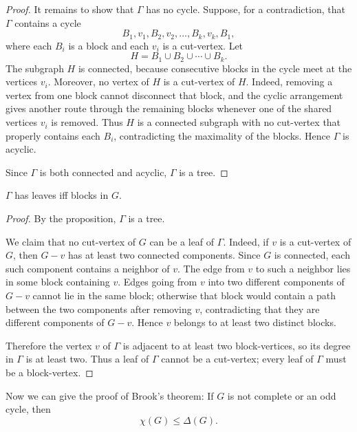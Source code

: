 \begin{proof}
    It remains to show that \(\Gamma\) has no cycle.  Suppose, for a contradiction, that \(\Gamma\) contains a cycle
    \[
        B_1, v_1, B_2, v_2, \ldots, B_k, v_k, B_1,
    \]
    where each \(B_i\) is a block and each \(v_i\) is a cut-vertex.  Let
    \[
        H = B_1 \cup B_2 \cup \cdots \cup B_k.
    \]
    The subgraph \(H\) is connected, because consecutive blocks in the cycle meet at the vertices \(v_i\).  Moreover, no vertex of \(H\) is a cut-vertex of \(H\).  Indeed, removing a vertex from one block cannot disconnect that block, and the cyclic arrangement gives another route through the remaining blocks whenever one of the shared vertices \(v_i\) is removed.  Thus \(H\) is a connected subgraph with no cut-vertex that properly contains each \(B_i\), contradicting the maximality of the blocks.  Hence \(\Gamma\) is acyclic.

    Since \(\Gamma\) is both connected and acyclic, \(\Gamma\) is a tree.
\end{proof}

\begin{corollary}
    \(\Gamma \) has leaves iff blocks in \(G\).  
\end{corollary}

\begin{proof}
    By the proposition, \(\Gamma\) is a tree.

    We claim that no cut-vertex of \(G\) can be a leaf of \(\Gamma\).  Indeed, if \(v\) is a cut-vertex of \(G\), then \(G-v\) has at least two connected components.  Since \(G\) is connected, each such component contains a neighbor of \(v\).  The edge from \(v\) to such a neighbor lies in some block containing \(v\).  Edges going from \(v\) into two different components of \(G-v\) cannot lie in the same block; otherwise that block would contain a path between the two components after removing \(v\), contradicting that they are different components of \(G-v\).  Hence \(v\) belongs to at least two distinct blocks.

    Therefore the vertex \(v\) of \(\Gamma\) is adjacent to at least two block-vertices, so its degree in \(\Gamma\) is at least two.  Thus a leaf of \(\Gamma\) cannot be a cut-vertex; every leaf of \(\Gamma\) must be a block-vertex.
\end{proof}

Now we can give the proof of Brook's theorem: If \(G\) is not complete or an odd cycle, then 
\[
    \chi (G) \le \Delta (G).
\] 

